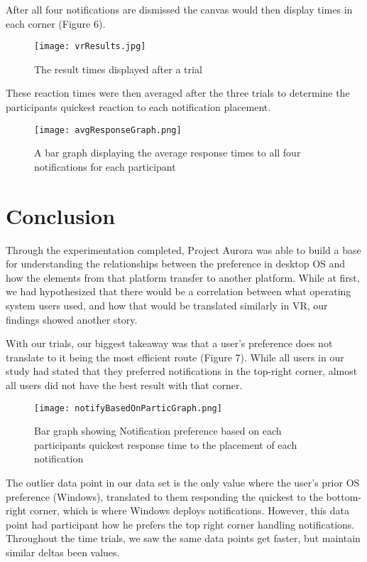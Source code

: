 \documentclass[acmlarge]{acmart}
\begin{document}
After all four notifications are dismissed the canvas would then display times in each corner (Figure 6). 

\begin{figure}[H]
   \caption{The result times displayed after a trial}
  \centering
  \texttt{[image: vrResults.jpg]}
\end{figure}

These reaction times were then averaged after the three trials to determine the participants quickest reaction to each notification placement. 
\begin{figure}[H]
  \caption{A bar graph displaying the average response times to all four notifications for each participant}
  \centering
  \texttt{[image: avgResponseGraph.png]}
\end{figure}

\section{Conclusion}
Through the experimentation completed, Project Aurora was able to build a base for understanding the relationships between the preference in desktop OS and how the elements from that platform transfer to another platform. While at first, we had hypothesized that there would be a correlation between what operating system users used, and how that would be translated similarly in VR, our findings showed another story. 

With our trials, our biggest takeaway was that a user’s preference does not translate to it being the most efficient route (Figure 7). While all users in our study had stated that they preferred notifications in the top-right corner, almost all users did not have the best result with that corner. 
\begin{figure}[H]
  \caption{Bar graph showing Notification preference based on each participants quickest response time to the placement of each notification}
  \centering
  \texttt{[image: notifyBasedOnParticGraph.png]}
\end{figure}
The outlier data point in our data set is the only value where the user’s prior OS preference (Windows), translated to them responding the quickest to the bottom-right corner, which is where Windows deploys notifications. However, this data point had participant how he prefers the top right corner handling notifications. Throughout the time trials, we saw the same data points get faster, but maintain similar deltas been values. 
\end{document}
